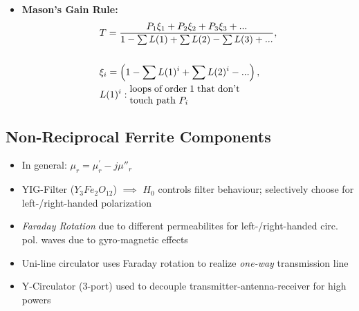 \begin{itemize}
\begin{itemize}
            \item \textbf{Mason's Gain Rule:}
                \begin{align*}
                    &T = \dfrac{P_1 \xi_1 + P_2\xi_2 + P_3\xi_3 +...}{1 - \sum L(1) + \sum L(2) - \sum L(3) + ...},\\\\
                    &\xi_i = \left(1 - \sum L(1)^i + \sum L(2)^i - ...\right),\\
                    &L(1)^i:\parbox{4cm}{loops of order 1 that don't touch path $P_i$}
                \end{align*}
        \end{itemize}
\end{itemize}

\subsection{Non-Reciprocal Ferrite  Components}
\begin{itemize}
    \itemsep0pt
    \item In general: \(\mu_r = \mu_r^\prime - j\mu''_r\)
    \item YIG-Filter ($Y_3 Fe_2 O_{12}$) $\implies$ $H_0$ controls filter behaviour; selectively choose for left-/right-handed polarization
    \item \textit{Faraday Rotation} due to different permeabilites for left-/right-handed circ. pol. waves due to gyro-magnetic effects
    \item Uni-line circulator uses Faraday rotation to realize \textit{one-way} transmission line
    \item Y-Circulator (3-port) used to decouple transmitter-antenna-receiver for high powers
\end{itemize}
